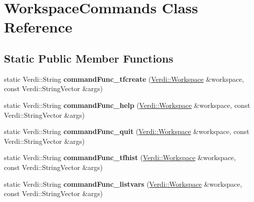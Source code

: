 \hypertarget{class_workspace_commands}{\section{\-Workspace\-Commands \-Class \-Reference}
\label{class_workspace_commands}
}
\subsection*{\-Static \-Public \-Member \-Functions}
\begin{DoxyCompactItemize}
\item 
\hypertarget{class_workspace_commands_a507d1141152fd144996c2d80b6e6d0b0}{static \-Verdi\-::\-String {\bfseries command\-Func\-\_\-tfcreate} (\hyperlink{class_verdi_1_1_workspace}{\-Verdi\-::\-Workspace} \&workspace, const \-Verdi\-::\-String\-Vector \&args)}\label{class_workspace_commands_a507d1141152fd144996c2d80b6e6d0b0}

\item 
\hypertarget{class_workspace_commands_aa16049292fff51d8bd17372fc9841689}{static \-Verdi\-::\-String {\bfseries command\-Func\-\_\-help} (\hyperlink{class_verdi_1_1_workspace}{\-Verdi\-::\-Workspace} \&workspace, const \-Verdi\-::\-String\-Vector \&args)}\label{class_workspace_commands_aa16049292fff51d8bd17372fc9841689}

\item 
\hypertarget{class_workspace_commands_afd2c24bdacc0f5247fbca2ebb3256498}{static \-Verdi\-::\-String {\bfseries command\-Func\-\_\-quit} (\hyperlink{class_verdi_1_1_workspace}{\-Verdi\-::\-Workspace} \&workspace, const \-Verdi\-::\-String\-Vector \&args)}\label{class_workspace_commands_afd2c24bdacc0f5247fbca2ebb3256498}

\item 
\hypertarget{class_workspace_commands_ae81da106432c01cf8155e2c7e1d970e7}{static \-Verdi\-::\-String {\bfseries command\-Func\-\_\-tfhist} (\hyperlink{class_verdi_1_1_workspace}{\-Verdi\-::\-Workspace} \&workspace, const \-Verdi\-::\-String\-Vector \&args)}\label{class_workspace_commands_ae81da106432c01cf8155e2c7e1d970e7}

\item 
\hypertarget{class_workspace_commands_a6d26d9ae17763236307449e0d4eb2cf0}{static \-Verdi\-::\-String {\bfseries command\-Func\-\_\-listvars} (\hyperlink{class_verdi_1_1_workspace}{\-Verdi\-::\-Workspace} \&workspace, const \-Verdi\-::\-String\-Vector \&args)}\label{class_workspace_commands_a6d26d9ae17763236307449e0d4eb2cf0}


\end{DoxyCompactItemize}
